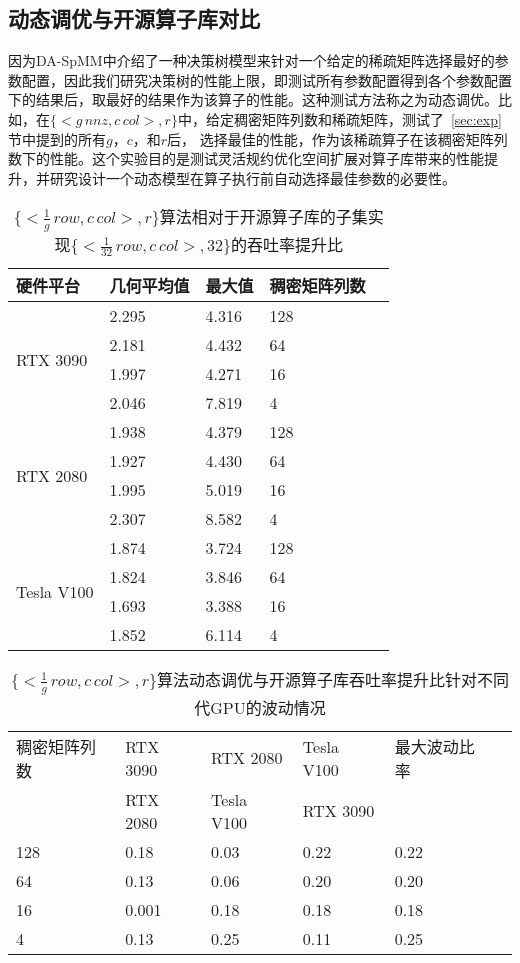 \subsection{动态调优与开源算子库对比}\label{sec:overori}
因为DA-SpMM中介绍了一种决策树模型来针对一个给定的稀疏矩阵选择最好的参数配置，因此我们研究决策树的性能上限，即测试所有参数配置得到各个参数配置下的结果后，取最好的结果作为该算子的性能。这种测试方法称之为动态调优。比如，在$\{<g\,nnz , c\,col>,r\}$中，给定稠密矩阵列数和稀疏矩阵，测试了~\ref{sec:exp}节中提到的所有$g$，$c$，和$r$后，
选择最佳的性能，作为该稀疏算子在该稠密矩阵列数下的性能。这个实验目的是测试灵活规约优化空间扩展对算子库带来的性能提升，并研究设计一个动态模型在算子执行前自动选择最佳参数的必要性。
\begin{table}
  \centering
  \caption{$\{<\frac{1}{g}\,row , c\,col>,r\}$算法相对于开源算子库的子集实现$\{<\frac{1}{32}\,row , c\,col>,32\}$的吞吐率提升比}
  \begin{tabular}{lllll}
  \toprule
  硬件平台 & 几何平均值  & 最大值 & 稠密矩阵列数 \\
  \midrule
  \multirow{4}{*}{RTX 3090}& 2.295   & 4.316  & 128\\
                          & 2.181   & 4.432  & 64\\
                          & 1.997   & 4.271  & 16\\
                          & 2.046   & 7.819  & 4\\
  \hline
  \multirow{4}{*}{RTX 2080}& 1.938   & 4.379  & 128\\
                          & 1.927   & 4.430  & 64\\
                          & 1.995   & 5.019  & 16\\
                          & 2.307   & 8.582  & 4\\
  \hline
  \multirow{4}{*}{Tesla V100}   & 1.874   & 3.724  & 128\\
                          & 1.824   & 3.846  & 64\\
                          & 1.693   & 3.388  & 16\\
                          & 1.852   & 6.114  & 4\\
  \bottomrule
  \end{tabular}
  \label{tab:over-ori-rb}%
\end{table}
\begin{table}
  \centering
  \caption{$\{<\frac{1}{g}\,row , c\,col>,r\}$算法动态调优与开源算子库吞吐率提升比针对不同代GPU的波动情况}
  \begin{tabular}{llllll}
  \toprule
  稠密矩阵列数 & RTX 3090 & RTX 2080   & Tesla V100 & 最大波动比率 \\
    & RTX 2080 & Tesla V100 & RTX 3090   &  \\
  \midrule
  128 & 0.18 & 0.03 & 0.22 & 0.22 \\
  64  & 0.13 & 0.06 & 0.20 & 0.20 \\
  16  & 0.001 & 0.18 & 0.18 & 0.18 \\
  4   & 0.13 & 0.25 & 0.11 & 0.25 \\
  \bottomrule
  \end{tabular}
  \label{tab:hw-rb}
\end{table}
